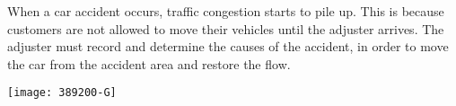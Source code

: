 When a car accident occurs,
traffic congestion starts to pile up.
This is because
customers are not allowed
to move their vehicles
until the adjuster arrives.  
The adjuster must record and determine
the causes of the accident, 
in order to
move the car from the accident area
and restore the flow.
\begin{center}
  \texttt{[image: 389200-G]}
\end{center}
